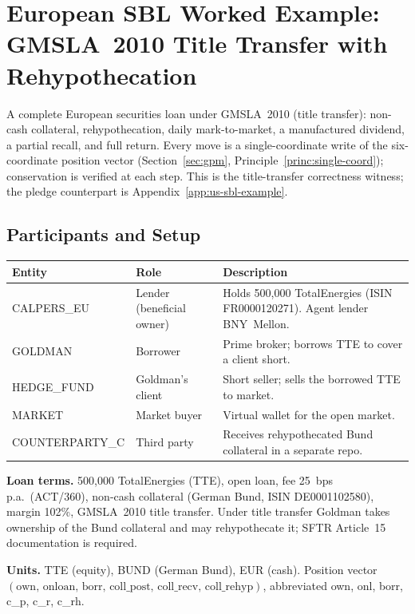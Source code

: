 \section{European SBL Worked Example: GMSLA~2010 Title Transfer with Rehypothecation}
\label{sec:appH}
\label{app:eu-sbl-example}

A complete European securities loan under GMSLA~2010 (title transfer): non-cash collateral, rehypothecation, daily mark-to-market, a manufactured dividend, a partial recall, and full return. Every move is a single-coordinate write of the six-coordinate position vector (Section~\ref{sec:gpm}, Principle~\ref{princ:single-coord}); conservation is verified at each step. This is the title-transfer correctness witness; the pledge counterpart is Appendix~\ref{app:us-sbl-example}.

\subsection{Participants and Setup}

\begin{center}\small
\begin{tabular}{l l p{7.2cm}}
\toprule
\textbf{Entity} & \textbf{Role} & \textbf{Description} \\
\midrule
CALPERS\_EU & Lender (beneficial owner) & Holds 500{,}000 TotalEnergies (ISIN FR0000120271). Agent lender BNY~Mellon. \\
GOLDMAN & Borrower & Prime broker; borrows TTE to cover a client short. \\
HEDGE\_FUND & Goldman's client & Short seller; sells the borrowed TTE to market. \\
MARKET & Market buyer & Virtual wallet for the open market. \\
COUNTERPARTY\_C & Third party & Receives rehypothecated Bund collateral in a separate repo. \\
\bottomrule
\end{tabular}
\end{center}

\noindent\textbf{Loan terms.} 500{,}000 TotalEnergies (TTE), open loan, fee 25~bps p.a.\ (ACT/360), non-cash collateral (German Bund, ISIN DE0001102580), margin 102\%, GMSLA~2010 title transfer. Under title transfer Goldman takes ownership of the Bund collateral and may rehypothecate it; SFTR Article~15 documentation is required.

\noindent\textbf{Units.} TTE (equity), BUND (German Bund), EUR (cash). Position vector $(\mathrm{own},\,\allowbreak\mathrm{onloan},\,\allowbreak\mathrm{borr},\,\allowbreak\mathrm{coll\_post},\,\allowbreak\mathrm{coll\_recv},\,\allowbreak\mathrm{coll\_rehyp})$, abbreviated own, onl, borr, c\_p, c\_r, c\_rh.

